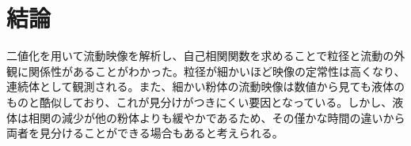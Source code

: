 \documentclass[a4paper,10pt,twocolumn,dvipdfmx]{jsarticle}
\begin{document}
\section{結論}
二値化を用いて流動映像を解析し、自己相関関数を求めることで粒径と流動の外観に関係性があることがわかった。粒径が細かいほど映像の定常性は高くなり、連続体として観測される。また、細かい粉体の流動映像は数値から見ても液体のものと酷似しており、これが見分けがつきにくい要因となっている。しかし、液体は相関の減少が他の粉体よりも緩やかであるため、その僅かな時間の違いから両者を見分けることができる場合もあると考えられる。
\end{document}
